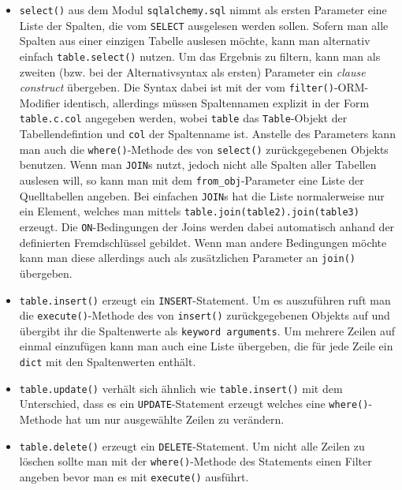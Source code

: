 \begin{itemize}

\item \texttt{select()} aus dem Modul \texttt{sqlalchemy.sql} nimmt als ersten
Parameter eine Liste der Spalten, die vom \texttt{SELECT} ausgelesen werden
sollen. Sofern man alle Spalten aus einer einzigen Tabelle auslesen möchte, kann
man alternativ einfach \texttt{table.select()} nutzen.
Um das Ergebnis zu filtern, kann man als zweiten (bzw. bei der Alternativsyntax
als ersten) Parameter ein \emph{clause construct} übergeben. Die Syntax dabei
ist mit der vom \texttt{filter()}-ORM-Modifier identisch, allerdings müssen
Spaltennamen explizit in der Form \texttt{table.c.col} angegeben werden, wobei
\texttt{table} das \texttt{Table}-Objekt der Tabellendefintion und \texttt{col}
der Spaltenname ist. Anstelle des Parameters kann man auch die
\texttt{where()}-Methode des von \texttt{select()} zurückgegebenen Objekts
benutzen. Wenn man \texttt{JOIN}s nutzt, jedoch nicht alle Spalten aller
Tabellen auslesen will, so kann man mit dem \texttt{from\_obj}-Parameter eine
Liste der Quelltabellen angeben. Bei einfachen \texttt{JOIN}s hat die Liste
normalerweise nur ein Element, welches man mittels
\texttt{table.join(table2).join(table3)} erzeugt. Die \texttt{ON}-Bedingungen
der Joins werden dabei automatisch anhand der definierten Fremdschlüssel
gebildet. Wenn man andere Bedingungen möchte kann man diese allerdings auch als
zusätzlichen Parameter an \texttt{join()} übergeben.

\item \texttt{table.insert()} erzeugt ein \texttt{INSERT}-Statement. Um es
auszuführen ruft man die \texttt{execute()}-Methode des von \texttt{insert()}
zurückgegebenen Objekts auf und übergibt ihr die Spaltenwerte als
\texttt{keyword arguments}. Um mehrere Zeilen auf einmal einzufügen kann man
auch eine Liste übergeben, die für jede Zeile ein \texttt{dict} mit den
Spaltenwerten enthält.

\item \texttt{table.update()} verhält sich ähnlich wie \texttt{table.insert()}
mit dem Unterschied, dass es ein \texttt{UPDATE}-Statement erzeugt welches eine
\texttt{where()}-Methode hat um nur ausgewählte Zeilen zu verändern.

\item \texttt{table.delete()} erzeugt ein \texttt{DELETE}-Statement. Um nicht
alle Zeilen zu löschen sollte man mit der \texttt{where()}-Methode des
Statements einen Filter angeben bevor man es mit \texttt{execute()} ausführt.
\end{itemize}

